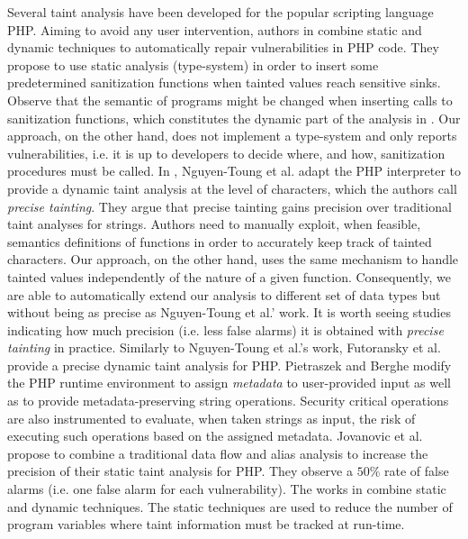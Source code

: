 \documentclass[oribibl]{llncs}
\begin{document}
Several taint analysis have been developed for the popular
scripting language PHP. 
Aiming to avoid any user intervention, 
authors in \cite{WebSSARI} combine static and dynamic
techniques to automatically repair vulnerabilities in PHP code. 
They 
propose to use static analysis (type-system) in order to insert some predetermined 
sanitization functions when tainted values  
reach sensitive sinks. 
Observe that the semantic 
of programs might be changed when inserting calls to sanitization functions, which constitutes the dynamic
part of the analysis in \cite{WebSSARI}.  
Our approach, on the other hand, does not implement a type-system and only reports vulnerabilities, i.e.  
it is up to developers
to decide where, and how, sanitization procedures must be called. 
In \cite{Nguyen05}, 
Nguyen-Toung et al. adapt the PHP interpreter to provide a dynamic 
taint analysis at the level of characters, which the authors 
call \emph{precise tainting}. 
They argue that precise tainting gains precision over traditional 
taint analyses for strings.
Authors need to manually  
exploit, when feasible, semantics definitions of functions 
in order to accurately keep track of tainted characters. 
Our approach, on the other hand, uses the same mechanism to 
handle tainted values 
independently of the nature of a given function. Consequently, 
we are able to automatically extend our analysis to 
different set of data types but without being as precise as 
Nguyen-Toung et al.' work. 
It is worth seeing studies indicating 
how much precision (i.e. less false alarms) 
it is obtained with \emph{precise tainting} in practice.
Similarly to Nguyen-Toung et al.'s work,
Futoransky \cite{Futo07} 
et al. provide a precise dynamic taint analysis for PHP.
Pietraszek and Berghe \cite{Pietraszek05defendingagainst}
modify the PHP runtime environment to 
assign \emph{metadata} to user-provided input as well as to 
provide metadata-preserving string operations. Security critical 
operations are also   
instrumented to evaluate, when taken strings as input, 
the risk of executing such operations based on the assigned metadata.
Jovanovic et al. \cite{Jovanovic06pixy:a} 
propose to combine a traditional data flow and alias 
analysis to increase the precision of their static taint analysis for PHP.
They observe a $50\%$ rate of false alarms (i.e. one false alarm for 
each vulnerability). 
The works in \cite{Saner, Monga:et:all:2009} combine static 
and dynamic techniques.
The static techniques are 
used to 
reduce the number of program variables 
where taint information must be tracked at 
run-time.
\end{document}
